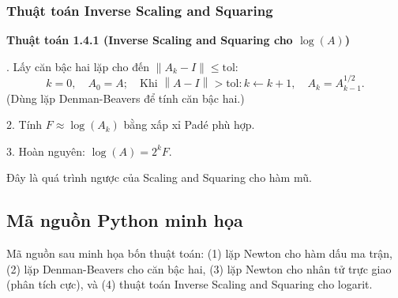 \documentclass[12pt,a4paper]{report}
\newcommand{\norm}[1]{\left\lVert #1 \right\rVert}
\begin{document}
\subsubsection{Thuật toán Inverse Scaling and Squaring}

\begin{algobox}
\textbf{Thuật toán 1.4.1 (Inverse Scaling and Squaring cho $\log(A)$)}

. Lấy căn bậc hai lặp cho đến $\norm{A_k - I} \le \text{tol}$:
\[
   k = 0,\quad A_0 = A;\quad
   \text{Khi } \norm{A-I} > \text{tol}: k \leftarrow k+1,\quad A_k = A_{k-1}^{1/2}.
\]
(Dùng lặp Denman-Beavers để tính căn bậc hai.)

2. Tính $F \approx \log(A_k)$ bằng xấp xỉ Padé phù hợp.

3. Hoàn nguyên: $\log(A) = 2^k F$.

\medskip
Đây là quá trình ngược của Scaling and Squaring cho hàm mũ.
\end{algobox}

\subsection{Mã nguồn Python minh họa}

Mã nguồn sau minh họa bốn thuật toán: (1) lặp Newton cho hàm dấu ma trận,
(2) lặp Denman-Beavers cho căn bậc hai, (3) lặp Newton cho nhân tử trực giao
(phân tích cực), và (4) thuật toán Inverse Scaling and Squaring cho logarit.
\end{document}
